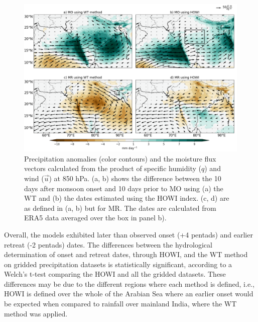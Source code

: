 \begin{figure}[t!]
\centering
 \includegraphics[width=0.95\linewidth]{figures/wav_fig8.png}
\caption[Precipitation anomalies during Indian monsoon onset]{  Precipitation anomalies (color contours) and the moisture flux vectors calculated from the product of specific humidity ($q$) and wind ($\vec{u}$) at 850 hPa. (a, b) shows the difference between the 10 days after monsoon onset and 10 days prior to MO using (a) the WT and (b) the dates estimated using the HOWI index. (c, d) are as defined in (a, b) but for MR. The dates are calculated from ERA5 data averaged over the box in panel b). }
\label{fig:wav_fig8}
\end{figure}

Overall, the models exhibited later than observed onset (+4 pentads) and earlier retreat  (-2 pentads) dates. The differences between the hydrological determination of onset and retreat dates, through HOWI, and the WT method on gridded precipitation datasets is statistically significant, according to a Welch's t-test comparing the HOWI and all the gridded datasets. These differences may be due to the different regions where each method is defined, i.e., HOWI is defined over the whole of the Arabian Sea where an earlier onset would be expected when compared to rainfall over mainland India, where the WT method was applied. 

